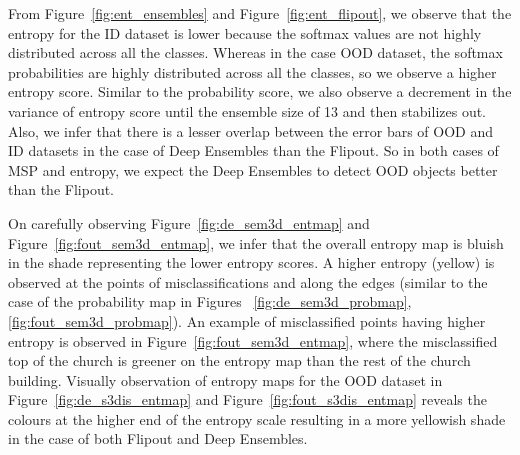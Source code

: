     From Figure~\ref{fig:ent_ensembles} and Figure~\ref{fig:ent_flipout}, we observe that the entropy for the ID dataset is lower because the softmax values are not highly distributed across all the classes.
    Whereas in the case OOD dataset, the softmax probabilities are highly distributed across all the classes, so we observe a higher entropy score.
    Similar to the probability score, we also observe a decrement in the variance of entropy score until the ensemble size of 13 and then stabilizes out.
    Also, we infer that there is a lesser overlap between the error bars of OOD and ID datasets in the case of Deep Ensembles than the Flipout.
    So in both cases of MSP and entropy, we expect the Deep Ensembles to detect OOD objects better than the Flipout.

    On carefully observing Figure~\ref{fig:de_sem3d_entmap} and Figure~\ref{fig:fout_sem3d_entmap}, we infer that the overall entropy map is bluish in the shade representing the lower entropy scores.
    A higher entropy (yellow) is observed at the points of misclassifications and along the edges (similar to the case of the probability map in Figures ~\ref{fig:de_sem3d_probmap}, \ref{fig:fout_sem3d_probmap}).
    An example of misclassified points having higher entropy is observed in Figure~\ref{fig:fout_sem3d_entmap}, where the misclassified top of the church is greener on the entropy map than the rest of the church building.
    Visually observation of entropy maps for the OOD dataset in Figure~\ref{fig:de_s3dis_entmap} and Figure~\ref{fig:fout_s3dis_entmap} reveals the colours at the higher end of the entropy scale resulting in a more yellowish shade in the case of both Flipout and Deep Ensembles.

